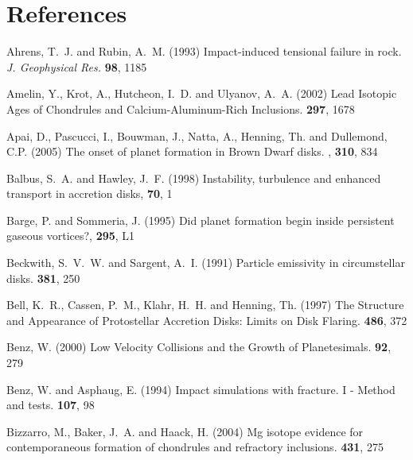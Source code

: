\renewcommand{\hdrtitle}{References}

\clearpage

\section{References}
\begin{literature}
\item 
Ahrens, T.~J. and Rubin, A.~M. (1993) Impact-induced tensional failure in rock.
\textit{J. Geophysical Res.} \textbf{98}, 1185

\item 
Amelin, Y., Krot, A., Hutcheon, I.~D. and Ulyanov, A.~A. (2002)
Lead Isotopic Ages of Chondrules and Calcium-Aluminum-Rich Inclusions. 
\sci \textbf{297}, 1678

\item
Apai, D., Pascucci, I., Bouwman, J., Natta, A., Henning, Th. and
Dullemond, C.P. (2005) The onset of planet formation in Brown Dwarf disks.
\sci, \textbf{310}, 834

\item 
Balbus, S.~A. and Hawley, J.~F. (1998) Instability, turbulence and enhanced
transport in accretion disks, \rmf \textbf{70}, 1

\item 
Barge, P. and Sommeria, J. (1995) Did planet formation begin inside
persistent gaseous vortices?, \aap \textbf{295}, L1

\item 
Beckwith, S.~V.~W. and Sargent, A.~I. (1991) Particle emissivity in
circumstellar disks. \apj \textbf{381}, 250

\item 
Bell, K.~R., Cassen, P.~M., Klahr, H.~H. and Henning, Th. (1997) 
The Structure and Appearance of Protostellar Accretion Disks: 
Limits on Disk Flaring. \apj \textbf{486}, 372

\item 
Benz, W. (2000) Low Velocity Collisions and the Growth of Planetesimals.
\ssr \textbf{92}, 279

\item 
Benz, W. and Asphaug, E. (1994) Impact simulations with fracture. I - Method
and tests. \ica \textbf{107}, 98

\item 
Bizzarro, M., Baker, J.~A. and Haack, H. (2004) Mg isotope evidence for
contemporaneous formation of chondrules and refractory inclusions. \nat
\textbf{431}, 275


\end{literature}
